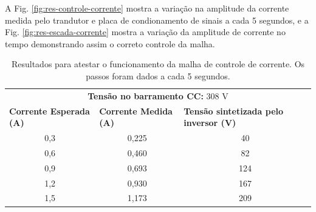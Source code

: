 A Fig. \ref{fig:res-controle-corrente} mostra a variação na amplitude da corrente medida pelo trandutor e placa de condionamento de sinais a cada 5 segundos, 
e a Fig. \ref{fig:res-escada-corrente} mostra a variação da amplitude de corrente no tempo demonstrando assim o correto controle da malha.

\begin{table}[h]
	\centering
	\caption{Resultados para atestar o funcionamento da malha de controle de corrente. Os passos foram dados a cada 5 segundos.}
	\label{tab:res-controle-corrente}
	
	\begin{tabular}{m{5cm}m{5cm}m{5cm}}
		\toprule
		\multicolumn{3}{c}{\textbf{Tensão no barramento CC:} 308 V} \\
		\textbf{Corrente Esperada (A)} & \textbf{Corrente Medida (A)} & \textbf{Tensão sintetizada pelo inversor (V)}\\
		\midrule
		\multicolumn{1}{c}{0,3} & \multicolumn{1}{c}{0,225} & \multicolumn{1}{c}{40} \\
		\multicolumn{1}{c}{0,6} & \multicolumn{1}{c}{0,460} & \multicolumn{1}{c}{82} \\
		\multicolumn{1}{c}{0,9} & \multicolumn{1}{c}{0,693} & \multicolumn{1}{c}{124} \\
		\multicolumn{1}{c}{1,2} & \multicolumn{1}{c}{0,930} & \multicolumn{1}{c}{167} \\
		\multicolumn{1}{c}{1,5} & \multicolumn{1}{c}{1,173} & \multicolumn{1}{c}{209} \\
		\bottomrule
	\end{tabular}
\end{table}

